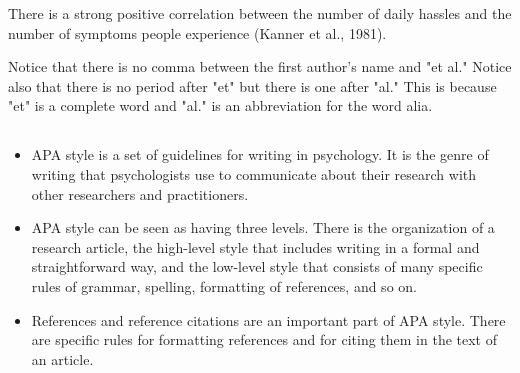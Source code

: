 \begin{kframe}
There is a strong positive correlation between the number of daily hassles and the number of symptoms people experience (Kanner et al., 1981).
\end{kframe}

Notice that there is no comma between the first author's name and "et al." Notice also that there is no period after "et" but there is one after "al." This is because "et" is a complete word and "al." is an abbreviation for the word alia.


\subsection{}
\begin{fullwidth}
\begin{itemize}
\item APA style is a set of guidelines for writing in psychology. It is the genre of writing that psychologists use to communicate about their research with other researchers and practitioners.

\item APA style can be seen as having three levels. There is the organization of a research article, the
high-level style that includes writing in a formal and straightforward way, and the low-level style
that consists of many specific rules of grammar, spelling, formatting of references, and so on.

\item References and reference citations are an important part of APA style. There are specific rules for
formatting references and for citing them in the text of an article.

\end{itemize}
\end{fullwidth}

 

